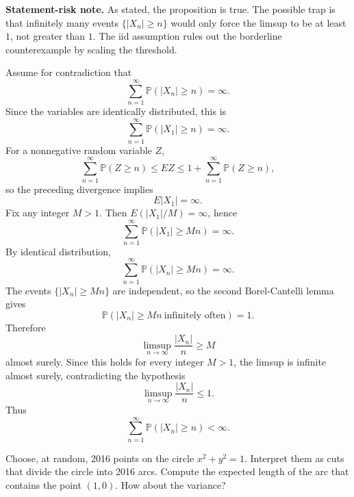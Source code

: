\begin{solution}
\textbf{Statement-risk note.}
As stated, the proposition is true. The possible trap is that infinitely many events
$\{|X_n|\geq n\}$ would only force the limsup to be at least $1$, not greater than $1$.
The iid assumption rules out the borderline counterexample by scaling the threshold.

Assume for contradiction that
\[
\sum_{n=1}^\infty \mathbb P(|X_n|\geq n)=\infty.
\]
Since the variables are identically distributed, this is
\[
\sum_{n=1}^\infty \mathbb P(|X_1|\geq n)=\infty.
\]
For a nonnegative random variable $Z$,
\[
\sum_{n=1}^\infty \mathbb P(Z\geq n)\leq E Z\leq
1+\sum_{n=1}^\infty \mathbb P(Z\geq n),
\]
so the preceding divergence implies
\[
E|X_1|=\infty.
\]
Fix any integer $M>1$. Then $E(|X_1|/M)=\infty$, hence
\[
\sum_{n=1}^\infty \mathbb P(|X_1|\geq Mn)=\infty.
\]
By identical distribution,
\[
\sum_{n=1}^\infty \mathbb P(|X_n|\geq Mn)=\infty.
\]
The events $\{|X_n|\geq Mn\}$ are independent, so the second Borel-Cantelli lemma gives
\[
\mathbb P(|X_n|\geq Mn\ \text{infinitely often})=1.
\]
Therefore
\[
\limsup_{n\to\infty}\frac{|X_n|}{n}\geq M
\]
almost surely. Since this holds for every integer $M>1$, the limsup is infinite almost
surely, contradicting the hypothesis
\[
\limsup_{n\to\infty}\frac{|X_n|}{n}\leq 1.
\]
Thus
\[
\sum_{n=1}^\infty \mathbb P(|X_n|\geq n)<\infty.
\]
\end{solution}

\begin{exercise}\label{probability:2016:10}
Choose, at random, 2016 points on the circle $x^2 + y^2 = 1$. Interpret them as cuts that divide the circle into 2016 arcs. Compute the expected length of the arc that contains the point $(1,0)$. How about the variance?
\end{exercise}

